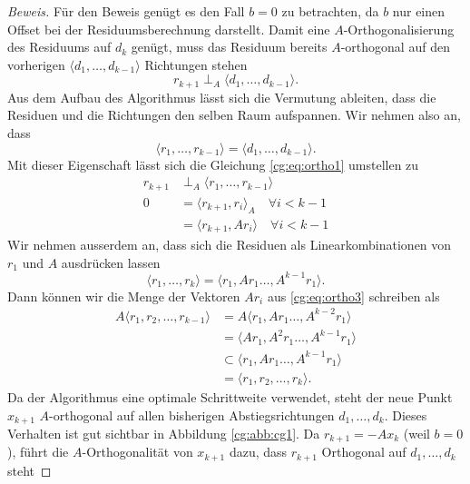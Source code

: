 \begin{proof}[Beweis]
Für den Beweis genügt es den Fall $b=0$ zu betrachten, da $b$ nur einen Offset bei der Residuumsberechnung darstellt.
Damit eine $A$-Orthogonalisierung des Residuums auf $d_k$ genügt, muss das Residuum bereits $A$-orthogonal auf den vorherigen $\langle d_1, \dots ,d_{k-1} \rangle$ Richtungen stehen
\begin{equation} \label{cg:eq:ortho1}
	r_{k+1} \perp_A \langle d_1, \dots ,d_{k-1} \rangle.
\end{equation} 
Aus dem Aufbau des Algorithmus lässt sich die Vermutung ableiten, dass die Residuen und die Richtungen den selben Raum aufspannen.
Wir nehmen also an, dass
\begin{equation}\label{cg:eq:ortho2}
\langle r_1, \dots ,r_{k-1} \rangle 
= 
\langle d_1, \dots ,d_{k-1} \rangle.
\end{equation}
Mit dieser Eigenschaft lässt sich die Gleichung \ref{cg:eq:ortho1} umstellen zu
\begin{align} \label{cg:eq:ortho3}
	r_{k+1} 	&\perp_A \langle r_1, \dots ,r_{k-1} \rangle \\
	0 			&= \langle r_{k+1}, r_i \rangle_A \quad \forall i < k-1 \\
				&= \langle r_{k+1}, Ar_i \rangle \quad \forall i < k-1 
\end{align} 
Wir nehmen ausserdem an, dass sich die Residuen als Linearkombinationen von $r_1$ und $A$ ausdrücken lassen
\begin{equation}
	\langle r_1, \dots ,r_k \rangle = \langle r_1, Ar_1 \dots ,A^{k-1}r_1 \rangle.
\end{equation}
Dann können wir die Menge der Vektoren $Ar_i$ aus \ref{cg:eq:ortho3} schreiben als
\begin{align}\label{cg:eq:ortho4}
	A \langle r_1, r_2, \dots , r_{k-1} \rangle &= A \langle r_1, Ar_1 \dots ,A^{k-2}r_1 \rangle \\
												&= \langle Ar_1, A^2r_1 \dots ,A^{k-1}r_1 \rangle \\
												&\subset \langle r_1, Ar_1 \dots ,A^{k-1}r_1 \rangle \\
												&= \langle r_1, r_2, \dots , r_k \rangle.
\end{align} 
Da der Algorithmus eine optimale Schrittweite verwendet, steht der neue Punkt $x_{k+1}$ $A$-orthogonal auf allen bisherigen Abstiegsrichtungen $d_1, \dots, d_k$.
Dieses Verhalten ist gut sichtbar in Abbildung \ref{cg:abb:cg1}.
Da $r_{k+1} = -Ax_k$ (weil $b=0$), führt die $A$-Orthogonalität von $x_{k+1}$ dazu, dass $r_{k+1}$ Orthogonal auf $d_1, \dots, d_k$ steht

\end{proof}
